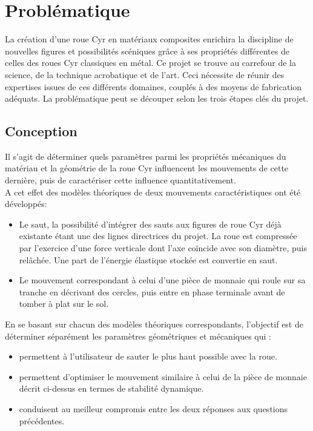 \clearpage

\section{Problématique}  %
La création d'une roue Cyr en matériaux composites enrichira la discipline de nouvelles figures et possibilités scéniques grâce à ses propriétés différentes de celles des roues Cyr classiques en métal. Ce projet se trouve au carrefour de la science, de la technique acrobatique et de l'art. Ceci nécessite de réunir des expertises issues de ces différents domaines, couplés à des moyens de fabrication adéquats. La problématique peut se découper selon les trois étapes clés du projet.

\subsection{Conception}
Il s'agit de déterminer quels paramètres parmi les propriétés mécaniques du matériau et la géométrie de la roue Cyr influencent les mouvements de cette dernière, puis de caractériser cette influence quantitativement. \\ 
A cet effet des modèles théoriques de deux mouvements caractéristiques ont été développés:
\begin{itemize}
    \item Le saut, la possibilité d’intégrer des sauts aux figures de roue Cyr déjà existante étant une des lignes directrices du projet. La roue est compressée par l'exercice d'une force verticale dont l’axe coïncide avec son diamètre, puis relâchée. Une part de l’énergie élastique stockée est convertie en saut. 
    \item Le mouvement correspondant à celui d’une pièce de monnaie qui roule sur sa tranche en décrivant des cercles, puis entre en phase terminale avant de tomber à plat sur le sol.
\end{itemize}

En se basant sur chacun des modèles théoriques correspondants, l’objectif est de déterminer séparément les paramètres géométriques et mécaniques qui :
\begin{itemize}
    \item  permettent à l’utilisateur de sauter le plus haut possible avec la roue.
    \item permettent d’optimiser le mouvement similaire à celui de la pièce de monnaie décrit ci-dessus en termes de stabilité dynamique.
    \item conduisent au meilleur compromis entre les deux réponses aux questions précédentes.
\end{itemize}


